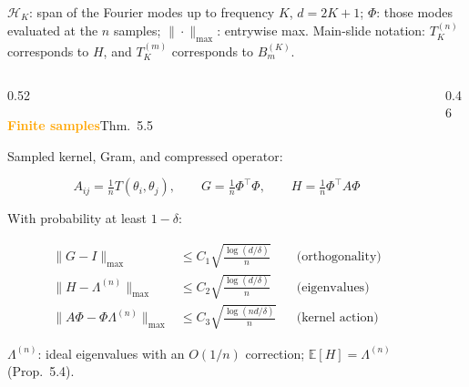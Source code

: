 \documentclass[aspectratio=169,9pt]{beamer}
\begin{document}
\begin{frame}[noframenumbering]
	{\textcolor{muted}{$\mathcal H_K$: span of the Fourier modes up to frequency $K$, $d=2K+1$; $\Phi$: those modes evaluated at the $n$ samples; $\|\cdot\|_{\max}$: entrywise max.}}
	{\tiny\textcolor{muted}{Main-slide notation: \(T_K^{(n)}\) corresponds to \(H\), and \(T_K^{(m)}\) corresponds to \(B_m^{(K)}\).}}

	\vspace{1mm}
	\begin{columns}[T,onlytextwidth]
		\begin{column}{0.52\textwidth}
			\begin{yellowcard}
				{\textcolor{orange}{\bfseries Finite samples}\hfill{\tiny\textcolor{muted}{Thm.~5.5}}}\par\vspace{1mm}
				{\scriptsize Sampled kernel, Gram, and compressed operator:}\par\vspace{-1.5mm}
				{\scriptsize
					\[
						A_{ij}=\tfrac1n T(\theta_i,\theta_j),
						\qquad
						G=\tfrac1n\Phi^\top\Phi,
						\qquad
						H=\tfrac1n\Phi^\top A\Phi
					\]
				}
				\vspace{-3.5mm}\par
				{\scriptsize With probability at least $1-\delta$:}\par\vspace{-1.5mm}
				{\scriptsize
					\[
						\begin{aligned}
							\|G-I\|_{\max}
							 & \le
							C_1\sqrt{\tfrac{\log(d/\delta)}{n}}
							 &     & \text{(orthogonality)} \\[0.6mm]
							\|H-\Lambda^{(n)}\|_{\max}
							 & \le
							C_2\sqrt{\tfrac{\log(d/\delta)}{n}}
							 &     & \text{(eigenvalues)}   \\[0.6mm]
							\|A\Phi-\Phi\Lambda^{(n)}\|_{\max}
							 & \le
							C_3\sqrt{\tfrac{\log(nd/\delta)}{n}}
							 &     & \text{(kernel action)}
						\end{aligned}
					\]
				}
				\vspace{-2.5mm}\par
				{\tiny\textcolor{muted}{$\Lambda^{(n)}$: ideal eigenvalues with an $O(1/n)$ correction; $\mathbb{E}[H]=\Lambda^{(n)}$ (Prop.~5.4).}}
			\end{yellowcard}
		\end{column}
		\begin{column}{0.46\textwidth}

\end{column}
\end{columns}
\end{frame}
\end{document}
